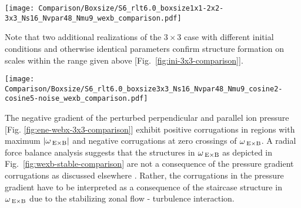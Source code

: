 \newpage
\begin{center}
	\captionsetup{type=figure}
	\texttt{[image: Comparison/Boxsize/S6\_rlt6.0\_boxsize1x1-2x2-3x3\_Ns16\_Nvpar48\_Nmu9\_wexb\_comparison.pdf]}
	\label{fig:wexb-1x1-2x2-3x3-comparison}
\end{center}

Note that two additional realizations of the $3\times3$ case with different initial conditions and otherwise identical parameters confirm structure formation on scales within the range given above [Fig.~\ref{fig:ini-3x3-comparison}].

\begin{center}
	\captionsetup{type=figure}
	\texttt{[image: Comparison/Boxsize/S6\_rlt6.0\_boxsize3x3\_Ns16\_Nvpar48\_Nmu9\_cosine2-cosine5-noise\_wexb\_comparison.pdf]}
	\label{fig:ini-3x3-comparison}
\end{center}

\newpage
The negative gradient of the perturbed perpendicular and parallel ion pressure [Fig. \ref{fig:ene-webx-3x3-comparison}] exhibit positive corrugations in regions with maximum $|\omega_{\mathrm{\:E \times B}}|$ and negative corrugations at zero crossings of $\omega_{\mathrm{\:E \times B}}$. 
A radial force balance analysis suggests that the structures in $\omega_{\mathrm{\:E \times B}}$ as depicted in Fig.~\ref{fig:wexb-stable-comparison} are not a consequence of the pressure gradient corrugations as discussed elsewhere \cite{Kosuga2013}.
Rather, the corrugations in the pressure gradient have to be interpreted as a consequence of the staircase structure in $\omega_{\mathrm{\:E \times B}}$ due to the stabilizing zonal flow - turbulence interaction.

